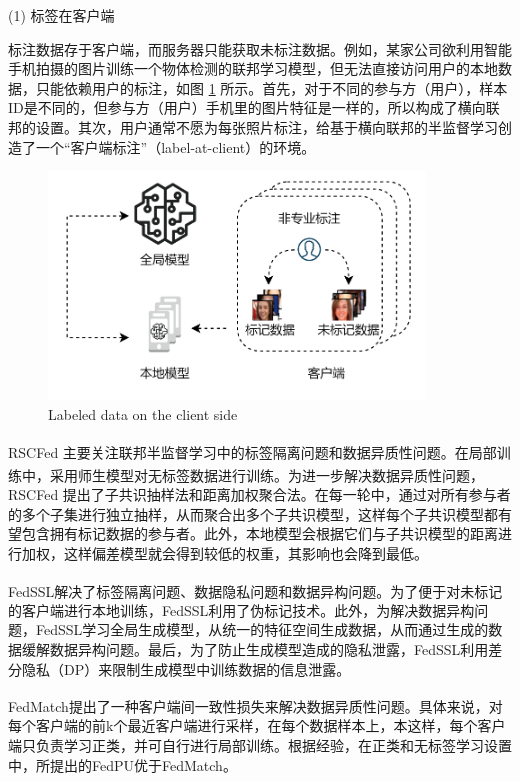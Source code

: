 (1) 标签在客户端

标注数据存于客户端，而服务器只能获取未标注数据。例如，某家公司欲利用智能手机拍摄的图片训练一个物体检测的联邦学习模型，但无法直接访问用户的本地数据，只能依赖用户的标注，如图 \ref{LabelAtClient} 所示。首先，对于不同的参与方（用户），样本ID是不同的，但参与方（用户）手机里的图片特征是一样的，所以构成了横向联邦的设置。其次，用户通常不愿为每张照片标注，给基于横向联邦的半监督学习创造了一个“客户端标注”（label-at-client）的环境。

\vspace{-0.1cm}
\begin{figure}[h]
	\centering
	\includegraphics[width=10cm]{chapters/imgs/LabelAtClient}
	{\wuhao Labeled data on the client side}
	\label{LabelAtClient}
\end{figure}
\vspace{-0.35cm}

RSCFed\textsuperscript{\cite{liang2022rscfed}} 主要关注联邦半监督学习中的标签隔离问题和数据异质性问题。在局部训练中，采用师生模型\textsuperscript{\cite{tarvainen2017mean}}对无标签数据进行训练。为进一步解决数据异质性问题，RSCFed 提出了子共识抽样法和距离加权聚合法。在每一轮中，通过对所有参与者的多个子集进行独立抽样，从而聚合出多个子共识模型，这样每个子共识模型都有望包含拥有标记数据的参与者。此外，本地模型会根据它们与子共识模型的距离进行加权，这样偏差模型就会得到较低的权重，其影响也会降到最低。

FedSSL\textsuperscript{\cite{fan2022private}}解决了标签隔离问题、数据隐私问题和数据异构问题。为了便于对未标记的客户端进行本地训练，FedSSL利用了伪标记技术。此外，为解决数据异构问题，FedSSL学习全局生成模型，从统一的特征空间生成数据，从而通过生成的数据缓解数据异构问题。最后，为了防止生成模型造成的隐私泄露，FedSSL利用差分隐私（DP）来限制生成模型中训练数据的信息泄露。

FedMatch\textsuperscript{\cite{jeong2020federated}}提出了一种客户端间一致性损失来解决数据异质性问题。具体来说，对每个客户端的前k个最近客户端进行采样，在每个数据样本上，本这样，每个客户端只负责学习正类，并可自行进行局部训练。根据经验，在正类和无标签学习设置中，所提出的FedPU优于FedMatch。

